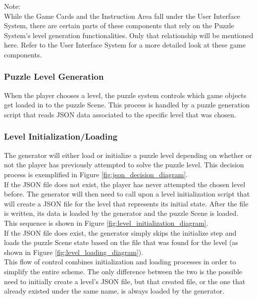 Note:\\

While the Game Cards and the Instruction Area fall under the User
Interface System, there are certain parts of these components that rely on
the Puzzle System’s level generation functionalities. Only that relationship
will be mentioned here. Refer to the User Interface System for a more detailed
look at these game components.

\subsubsection{Puzzle Level Generation}
When the player chooses a level, the puzzle system controls
which game objects get loaded in to the puzzle Scene. This process is handled
by a puzzle generation script that reads JSON data associated to the specific
level that was chosen.

\subsubsection{Level Initialization/Loading}
The generator will either load or initialize a puzzle level depending on whether
or not the player has previously attempted to solve the puzzle level. This
decision process is exemplified in Figure \ref{fig:json_decision_diagram}.\\

If the JSON file does not exist, the player has never attempted the chosen level before. The
generator will then need to call upon a level initialization script that will
create a JSON file for the level that represents its initial state. After the file
is written, its data is loaded by the generator and the puzzle Scene is loaded.
This sequence is shown in Figure \ref{fig:level_initialization_diagram}.\\

If the JSON file does exist, the generator simply skips the initialize step and
loads the puzzle Scene state based on the file that was found for the level (as
shown in Figure \ref{fig:level_loading_diagram}).\\

This flow of control combines initialization and loading processes in order to simplify
the entire scheme. The only difference between the two is the possible need to
initially create a level's JSON file, but that created file, or the one that already
existed under the same name, is always loaded by the generator.\\


